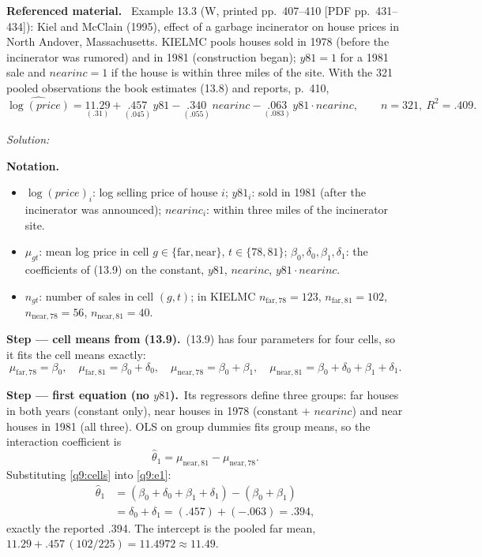 \documentclass[11pt,a4paper]{article}
\newif\ifsolucoes
\newcommand{\espacoresol}{4.5cm}   %
\newenvironment{refmaterial}{\par\smallskip\noindent\begingroup\small\textbf{Referenced material.}~}{\endgroup\par\smallskip}
\newenvironment{notacao}{\par\smallskip\noindent\textbf{Notation.}\begin{itemize}[leftmargin=1.4em,topsep=1pt,itemsep=0pt]\small}{\end{itemize}}
\newcommand{\resolespaco}{\ifsolucoes\else\par\textit{Solution:}\vspace{\espacoresol}\par\fi}
\newcommand{\passo}[2]{\par\smallskip\noindent\textbf{Step --- #1.}~#2}
\begin{document}
\begin{refmaterial}
Example 13.3 (W, printed pp.~407--410 [PDF pp.~431--434]): Kiel and McClain (1995), effect of a garbage
incinerator on house prices in North Andover, Massachusetts. KIELMC pools houses sold in 1978 (before the
incinerator was rumored) and in 1981 (construction began); $y81=1$ for a 1981 sale and $nearinc=1$ if the
house is within three miles of the site. With the 321 pooled observations the book estimates (13.8) and
reports, p.~410,
\[
\widehat{\log(price)}=\underset{(.31)}{11.29}+\underset{(.045)}{.457}\,y81-\underset{(.055)}{.340}\,nearinc-\underset{(.083)}{.063}\,y81\cdot nearinc,\qquad n=321,\ R^2=.409.\tag{13.9}
\]
\end{refmaterial}
\resolespaco
\begin{sol}
\begin{notacao}
\item $\log(price)_i$: log selling price of house $i$; $y81_i$: sold in 1981 (after the incinerator was
announced); $nearinc_i$: within three miles of the incinerator site.
\item $\mu_{gt}$: mean log price in cell $g\in\{\text{far},\text{near}\}$, $t\in\{78,81\}$;
$\beta_0,\delta_0,\beta_1,\delta_1$: the coefficients of (13.9) on the constant, $y81$, $nearinc$, $y81\cdot nearinc$.
\item $n_{gt}$: number of sales in cell $(g,t)$; in KIELMC $n_{\text{far},78}=123$, $n_{\text{far},81}=102$,
$n_{\text{near},78}=56$, $n_{\text{near},81}=40$.
\end{notacao}

\passo{cell means from (13.9)}{(13.9) has four parameters for four cells, so it fits the cell means exactly:
\begin{equation}
\mu_{\text{far},78}=\beta_0,\quad\mu_{\text{far},81}=\beta_0+\delta_0,\quad\mu_{\text{near},78}=\beta_0+\beta_1,\quad\mu_{\text{near},81}=\beta_0+\delta_0+\beta_1+\delta_1.\label{q9:cells}
\end{equation}}

\passo{first equation (no $y81$)}{Its regressors define three groups: far houses in both years (constant
only), near houses in 1978 (constant $+$ $nearinc$) and near houses in 1981 (all three). OLS on group
dummies fits group means, so the interaction coefficient is
\begin{equation}
\hat\theta_1=\mu_{\text{near},81}-\mu_{\text{near},78}.\label{q9:e1}
\end{equation}
Substituting \eqref{q9:cells} into \eqref{q9:e1}:
\begin{align}
\hat\theta_1&=(\beta_0+\delta_0+\beta_1+\delta_1)-(\beta_0+\beta_1)\label{q9:e1sub}\\
&=\delta_0+\delta_1=(.457)+(-.063)=.394,\label{q9:e1res}
\end{align}
exactly the reported .394. The intercept is the pooled far mean,
$11.29+.457\,(102/225)=11.4972\approx11.49$.}


\end{sol}
\end{document}
